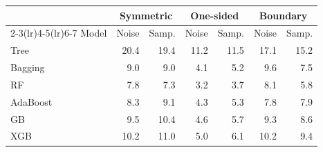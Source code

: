 \begin{tabular}{@{}lrrrrrr@{}}
\toprule
 & \multicolumn{2}{c}{Symmetric} & \multicolumn{2}{c}{One-sided} & \multicolumn{2}{c}{Boundary} \\
\cmidrule(lr){2-3}\cmidrule(lr){4-5}\cmidrule(lr){6-7}
Model & Noise & Samp. & Noise & Samp. & Noise & Samp. \\
\midrule
Tree & 20.4 & 19.4 & 11.2 & 11.5 & 17.1 & 15.2 \\
Bagging & 9.0 & 9.0 & 4.1 & 5.2 & 9.6 & 7.5 \\
RF & 7.8 & 7.3 & 3.2 & 3.7 & 8.1 & 5.8 \\
AdaBoost & 8.3 & 9.1 & 4.3 & 5.3 & 7.8 & 7.9 \\
GB & 9.5 & 10.4 & 4.6 & 5.7 & 9.3 & 8.6 \\
XGB & 10.2 & 11.0 & 5.0 & 6.1 & 10.2 & 9.4 \\
\bottomrule
\end{tabular}